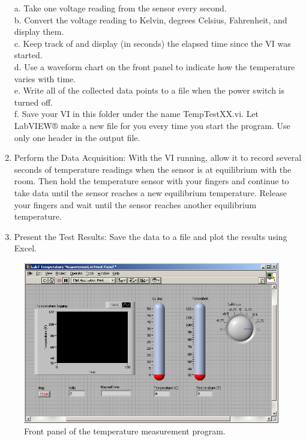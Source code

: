 \documentclass[11pt,letterpaper]{article}
\begin{document}
\begin{enumerate}
a.	Take one voltage reading from the sensor every second.\\
b.	Convert the voltage reading to Kelvin, degrees Celsius, Fahrenheit, and display them.\\
c.	Keep track of and display (in seconds) the elapsed time since the VI was started.\\
d.	Use a waveform chart on the front panel to indicate how the temperature varies with time.\\
e.	Write all of the collected data points to a file when the power switch is turned off.\\
f.	Save your VI in this folder under the name TempTestXX.vi. Let LabVIEW® make a new file for you every time you start the program. Use only one header in the output file.\\

\item Perform the Data Acquisition: With the VI running, allow it to record several seconds of temperature readings when the sensor is at equilibrium with the room.  Then hold the temperature sensor with your fingers and continue to take data until the sensor reaches a new equilibrium temperature.  Release your fingers and wait until the sensor reaches another equilibrium temperature. 
\item Present the Test Results: Save the data to a file and plot the results using Excel.  

\end{enumerate}

\begin{figure}
\centering
\includegraphics[width=1\linewidth]{Lab8_TemperatureMeasurementUsingLabVIEW_FrontPanel}
\caption{Front panel of the temperature measurement program.}
\label{fig:Lab8_TemperatureMeasurementUsingLabVIEW_FrontPanel}
\end{figure}
\end{document}
